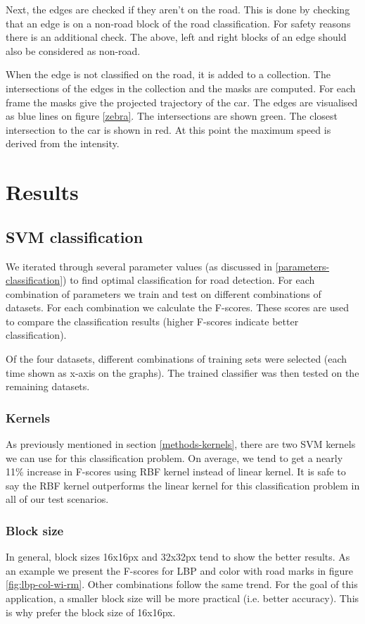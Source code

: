 \documentclass[runningheads,a4paper]{llncs}
\begin{document}
Next, the edges are checked if they aren't on the road. This is done by checking that an edge is on a non-road block of the road classification. For safety reasons there is an additional check. The above, left and right blocks of an edge should also be considered as non-road. 

When the edge is not classified on the road, it is added to a collection. The intersections of the edges in the collection and the masks are computed. For each frame the masks give the projected trajectory of the car. 
The edges are visualised as blue lines on figure \ref{zebra}. The intersections are shown green. The closest intersection to the car is shown in red. At this point the maximum speed is derived from the intensity. 

\section{Results}

\subsection{SVM classification}\label{results-svm-classification}
We iterated through several parameter values (as discussed in \ref{parameters-classification}) to find optimal classification for road detection. For each combination of parameters we train and test on different combinations of datasets. For each combination we calculate the F-scores. These scores are used to compare the classification results (higher F-scores indicate better classification). 

Of the four datasets, different combinations of training sets were selected (each time shown as x-axis on the graphs). The trained classifier was then tested on the remaining datasets.

\subsubsection{Kernels}
As previously mentioned in section \ref{methods-kernels}, there are two SVM kernels we can use for this classification problem. On average, we tend to get a nearly 11\% increase in F-scores using RBF kernel instead of linear kernel. It is safe to say the RBF kernel outperforms the linear kernel for this classification problem in all of our test scenarios. 

\subsubsection{Block size}
In general, block sizes 16x16px and 32x32px tend to show the better results. As an example we present the F-scores for LBP and color with road marks in figure \ref{fig:lbp-col-wi-rm}. Other combinations follow the same trend. For the goal of this application, a smaller block size will be more practical (i.e. better accuracy). This is why prefer the block size of 16x16px. 
\end{document}
